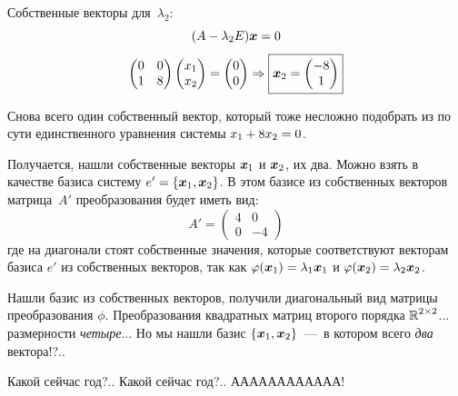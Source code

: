 \documentclass[a4paper,12pt]{article}
\begin{document}
\begin{solution}
    Собственные векторы для~$\lambda_2$:
    \[
      (A - \lambda_2 E) \boldsymbol x = 0
    \]
    \[
      \begin{pmatrix}
        0 & 0\\
        1 & 8
      \end{pmatrix} \begin{pmatrix}
        x_1\\
        x_2
      \end{pmatrix} = \begin{pmatrix}
        0\\
        0
      \end{pmatrix}
      \Rightarrow \boxed{
        \boldsymbol x_2 = \begin{pmatrix}
          -8\\
          1
        \end{pmatrix}
      }
    \]
    
    Снова всего один собственный вектор, который тоже несложно подобрать из по сути единственного уравнения системы $x_1 \hm+ 8 x_2 \hm= 0$.
    
    Получается, нашли собственные векторы $\boldsymbol x_1$ и $\boldsymbol x_2$, их два.
    Можно взять в качестве базиса систему $e' \hm= \{\bds x_1, \bds x_2\}$.
    В этом базисе из собственных векторов матрица~$A'$ преобразования будет иметь вид:
    \[
      A' = \begin{pmatrix}
        4 & 0\\
        0 & -4
      \end{pmatrix}
    \]
    где на диагонали стоят собственные значения, которые соответствуют векторам базиса $e'$ из собственных векторов, так как $\phi(\bds x_1) \hm= \lambda_1 \bds x_1$ и $\phi(\bds x_2) \hm= \lambda_2 \bds x_2$.
    
    Нашли базис из собственных векторов, получили диагональный вид матрицы преобразования $\phi$.
    Преобразования квадратных матриц второго порядка $\operatorname{\mathbb R}^{2\times 2}$...
    размерности \emph{четыре}...
    Но мы нашли базис $\{\boldsymbol x_1, \boldsymbol x_2\}$~---~в котором всего \emph{два} вектора!?..
    
    \bigskip
    
    Какой сейчас год?..
    Какой сейчас год?..
    АААААААААААА!
  \end{solution}
\end{document}
